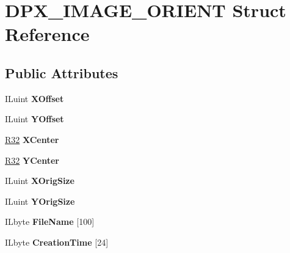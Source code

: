 \hypertarget{structDPX__IMAGE__ORIENT}{}\section{D\+P\+X\+\_\+\+I\+M\+A\+G\+E\+\_\+\+O\+R\+I\+E\+NT Struct Reference}
\label{structDPX__IMAGE__ORIENT}
\subsection*{Public Attributes}
\begin{DoxyCompactItemize}
\item 
\mbox{\label{structDPX__IMAGE__ORIENT_ab725304e793fb18557986cc66cf95c79}} 
I\+Luint {\bfseries X\+Offset}
\item 
\mbox{\label{structDPX__IMAGE__ORIENT_a9df1c5516a8ebb6c50dc858e93131940}} 
I\+Luint {\bfseries Y\+Offset}
\item 
\mbox{\label{structDPX__IMAGE__ORIENT_a0d9cc83206c914f16c92324517356eec}} 
\hyperlink{structR32}{R32} {\bfseries X\+Center}
\item 
\mbox{\label{structDPX__IMAGE__ORIENT_a51e1dfa0d3f52fe297da80e22fa21501}} 
\hyperlink{structR32}{R32} {\bfseries Y\+Center}
\item 
\mbox{\label{structDPX__IMAGE__ORIENT_a337bd850bc2301174438f93f12ec7262}} 
I\+Luint {\bfseries X\+Orig\+Size}
\item 
\mbox{\label{structDPX__IMAGE__ORIENT_aa5389477d8828e16fb5ea82a6d6acf32}} 
I\+Luint {\bfseries Y\+Orig\+Size}
\item 
\mbox{\label{structDPX__IMAGE__ORIENT_acea6f0c11cf752d8e4a504065d4a6e71}} 
I\+Lbyte {\bfseries File\+Name} \mbox{[}100\mbox{]}
\item 
\mbox{\label{structDPX__IMAGE__ORIENT_a2446e0ff1be9766b3a819be92e9fdd19}} 
I\+Lbyte {\bfseries Creation\+Time} \mbox{[}24\mbox{]}
\item 

\end{DoxyCompactItemize}
